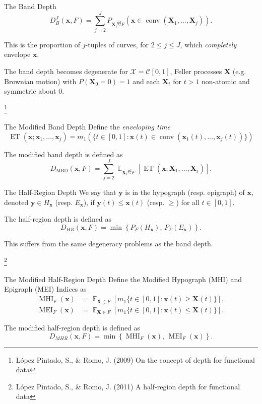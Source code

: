 \documentclass[handout, notes]{beamer}
\newcommand{\vx}{\bm{x}}
\newcommand{\vy}{\bm{y}}
\newcommand{\vX}{\bm{X}}
\newcommand{\iid}{\overset{\text{iid}}{\sim}}
\DeclareMathOperator{\E}{\mathbb{E}}
\DeclareMathOperator{\conv}{conv}
\DeclareMathOperator{\ET}{ET}
\DeclareMathOperator{\MHI}{MHI}
\DeclareMathOperator{\MEI}{MEI}
\DeclareMathOperator{\MBD}{MBD}
\newcommand\blfootnote[1]{%
  \begingroup
  \renewcommand\thefootnote{}\footnote{#1}%
  \addtocounter{footnote}{-1}%
  \endgroup
}
\begin{document}


    \begin{frame}{The Band Depth}
        \[
            D_B^J(\vx, F) = \sum_{j = 2}^J P_{\vX_i \iid F}(\vx \in \conv(\vX_1, \dots, \vX_j)).
        \]

        This is the proportion of $j$-tuples of curves, for $2 \leq j \leq J$,
        which \emph{completely} envelope $\vx$.

        The band depth becomes degenerate for $\mathscr{X} = \mathcal{C}[0,
        1]$, Feller processes $\vX$ (e.g. Brownian motion) with $P(\vX_0 = 0)
        = 1$ and each $\vX_t$ for $t > 1$ non-atomic and symmetric about $0$.

        \blfootnote{
            L\'opez Pintado, S., \& Romo, J. (2009) On the concept of depth
            for functional data
        }
    \end{frame}

    \begin{frame}{The Modified Band Depth}
        Define the \emph{enveloping time} \[
            \ET(\vx; \vx_1, \dots, \vx_j) = m_1(\{t \in [0, 1]\colon \vx(t) \in \conv(\vx_1(t), \dots, \vx_j(t))\})
        \]

        The modified band depth is defined as \[
            D_{\MBD}(\vx, F) = \sum_{j = 2}^J \E_{\vX_i \iid F}\left[\ET(\vx; \vX_1, \dots, \vX_j)\right].
        \]
    \end{frame}

    \begin{frame}{The Half-Region Depth}
        We say that $\vy$ is in the hypograph (resp. epigraph) of $\vx$,
        denoted $\vy \in H_{\vx}$ (resp. $E_{\vx}$), if $\vy(t) \leq \vx(t)$
        (resp. $\geq$) for all $t \in [0, 1]$.

        The half-region depth is defined as \[
            D_{HR}(\vx, F) = \min\left\{P_F(H_{\vx}),\, P_F(E_{\vx})\right\}.
        \]

        This suffers from the same degeneracy problems as the band depth.

        \blfootnote{
            L\'opez Pintado, S., \& Romo, J. (2011) A half-region depth for
            functional data
        }
    \end{frame}

    \begin{frame}{The Modified Half-Region Depth}
        Define the Modified Hypograph (MHI) and Epigraph (MEI) Indices as
        \begin{align*}
            \MHI_F(\vx) &= \E_{\vX \in F}[m_1\{t \in [0, 1]\colon \vx(t) \geq \vX(t)\}], \\
            \MEI_F(\vx) &= \E_{\vX \in F}[m_1\{t \in [0, 1]\colon \vx(t) \leq \vX(t)\}].
        \end{align*}

        The modified half-region depth is defined as \[
            D_{MHR}(\vx, F) = \min\left\{\MHI_F({\vx}),\, \MEI_F({\vx})\right\}.
        \]
    \end{frame}
\end{document}
